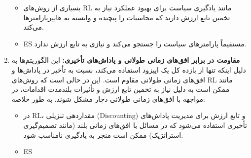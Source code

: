 \documentclass[12pt]{exam}
\begin{document}
\begin{questions}
\begin{enumerate}
\begin{itemize}
				\item
				بسیاری از روش‌های RL مانند یادگیری سیاست 
				برای بهبود عملکرد نیاز به تخمین تابع ارزش دارند که محاسبات را پیچیده و وابسته به هایپرپارامترها می‌کند.
				\item ES  مستقیماً پارامترهای سیاست را جستجو می‌کند و نیازی به تابع ارزش ندارد.
			\end{itemize}
			\item \textbf{مقاومت در برابر افق‌های زمانی طولانی و پاداش‌های تأخیری:}
			این الگوریتم‌ها به دلیل اینکه تنها از بازده کل یک اپیزود استفاده می‌کند، نسبت به تأخیر در پاداش‌ها و افق‌های زمانی طولانی مقاوم است. این در حالی است که روش‌های RL مانند
			ممکن است به دلیل نیاز به تخمین تابع ارزش و تأثیرات بلندمدت اقدامات، در مواجهه با افق‌های زمانی طولانی دچار مشکل شوند. به طور خلاصه:
			\begin{itemize}
				\item 
				در RL، مقداردهی تنزیلی (Discounting) و تابع ارزش برای مدیریت پاداش‌های تأخیری استفاده می‌شود که در مسائل با افق‌های زمانی بلند (مانند تصمیم‌گیری استراتژیک) ممکن است منجر به یادگیری نامناسب شود.
				\item  ES 
				

\end{itemize}
\end{enumerate}
\end{questions}
\end{document}
